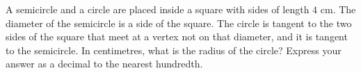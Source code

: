 A semicircle and a circle are placed inside a square with sides of length $4$ cm. The diameter of the semicircle is a side of the square. The circle is tangent to the two sides of the square that meet at a vertex not on that diameter, and it is tangent to the semicircle. In centimetres, what is the radius of the circle? Express your answer as a decimal to the nearest hundredth.
